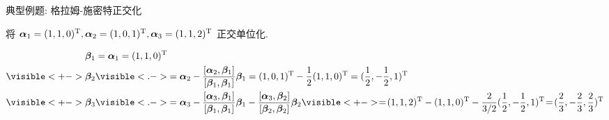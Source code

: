 \begin{frame}{典型例题: 格拉姆-施密特正交化}\small
	\onslide<+->
	\begin{example}
		将 ${\boldsymbol{\alpha}}_1=(1,1,0)^{\mathrm{T}},{\boldsymbol{\alpha}}_2=(1,0,1)^{\mathrm{T}},{\boldsymbol{\alpha}}_3=(1,1,2)^{\mathrm{T}}$ 正交单位化.
	\end{example}
	\onslide<+->
	\begin{solution}
		\begin{align*}
			\bmb_1&=\bma_1=(1,1,0)^\rmT\\
			\visible<+->{\bmb_2}&\visible<.->{=\bma_2-\frac{[\bma_2,\bmb_1]}{[\bmb_1,\bmb_1]}\bmb_1=(1,0,1)^\rmT-\frac12(1,1,0)^\rmT=(\frac12,-\frac12,1)^\rmT}\\
			\visible<+->{\bmb_3}&\visible<.->{=\bma_3-\frac{[\bma_3,\bmb_1]}{[\bmb_1,\bmb_1]}\bmb_1-\frac{[\bma_3,\bmb_2]}{[\bmb_2,\bmb_2]}\bmb_2}
			\visible<+->{\!=\!(1,1,2)^\rmT-(1,1,0)^\rmT-\frac2{3/2}(\frac12,-\frac12,1)^\rmT
			\!=\!(\frac23,-\frac23,\frac23)^\rmT}
		\end{align*}
		\onslide<+->{%
			\[
			\bfe_1=\dfrac{\bfb_1}{\|\bfb_1\|}
				=\frac1{\sqrt2}(1,1,0)^\rmT,\quad
			\bfe_2=\dfrac{\bfb_2}{\|\bfb_2\|}
				=\frac1{\sqrt6}(1,-1,2)^\rmT,\quad
			\bfe_3=\dfrac{\bfb_3}{\|\bfb_3\|}
				=\frac1{\sqrt3}(-1,1,1)^\rmT.
		\]}
	\end{solution}
\end{frame}


